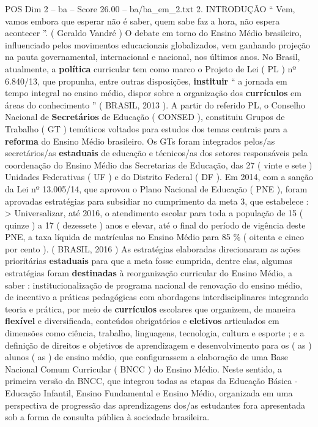 \begin{textsample}{POS Dim 2 – ba – Score 26.00 – ba/ba\_em\_2.txt}  \label{ex:f2_pos_037}
2.
INTRODUÇÃO “ Vem, vamos embora que esperar não é saber, quem sabe faz a hora, não espera acontecer ”. ( Geraldo Vandré ) O debate em torno do Ensino Médio brasileiro, influenciado pelos movimentos educacionais globalizados, vem ganhando projeção na pauta governamental, internacional e nacional, nos últimos anos.
No Brasil, atualmente, a \textbf{política} curricular tem como marco o Projeto de Lei ( PL ) nº 6.840/13, que propunha, entre outras disposições, \textbf{instituir} “ a jornada em tempo integral no ensino médio, dispor sobre a organização dos \textbf{currículos} em áreas do conhecimento ” ( BRASIL, 2013 ).
A partir do referido PL, o Conselho Nacional de \textbf{Secretários} de Educação ( CONSED ), constituiu Grupos de Trabalho ( GT ) temáticos voltados para estudos dos temas centrais para a \textbf{reforma} do Ensino Médio brasileiro.
Os GTs foram integrados pelos/as secretários/as \textbf{estaduais} de educação e técnicos/as dos setores responsáveis pela coordenação do Ensino Médio das Secretarias de Educação, das 27 ( vinte e sete ) Unidades Federativas ( UF ) e do Distrito Federal ( DF ).
Em 2014, com a sanção da Lei nº 13.005/14, que aprovou o Plano Nacional de Educação ( PNE ), foram aprovadas estratégias para subsidiar no cumprimento da meta 3, que estabelece : > Universalizar, até 2016, o atendimento escolar para toda a população de 15 ( quinze ) a 17 ( dezessete ) anos e elevar, até o final do período de vigência deste PNE, a taxa líquida de matrículas no Ensino Médio para 85 \% ( oitenta e cinco por cento ). ( BRASIL, 2016 ) As estratégias elaboradas direcionaram as ações prioritárias \textbf{estaduais} para que a meta fosse cumprida, dentre elas, algumas estratégias foram \textbf{destinadas} à reorganização curricular do Ensino Médio, a saber : institucionalização de programa nacional de renovação do ensino médio, de incentivo a práticas pedagógicas com abordagens interdisciplinares integrando teoria e prática, por meio de \textbf{currículos} escolares que organizem, de maneira \textbf{flexível} e diversificada, conteúdos obrigatórios e \textbf{eletivos} articulados em dimensões como ciência, trabalho, linguagens, tecnologia, cultura e esporte ; e a definição de direitos e objetivos de aprendizagem e desenvolvimento para os ( as ) alunos ( as ) de ensino médio, que configurassem a elaboração de uma Base Nacional Comum Curricular ( BNCC ) do Ensino Médio.
Neste sentido, a primeira versão da BNCC, que integrou todas as etapas da Educação Básica - Educação Infantil, Ensino Fundamental e Ensino Médio, organizada em uma perspectiva de progressão das aprendizagens dos/as estudantes fora apresentada sob a forma de consulta pública à sociedade brasileira.

\end{textsample}
